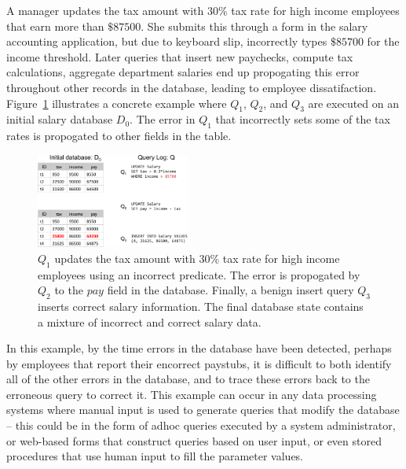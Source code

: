 {\color{blue}
\begin{example}\label{ex:telco}
  A manager updates the tax amount with $30\%$ tax rate for high income employees that earn more than $\$87500$.
  She submits this through a form in the salary accounting application, 
  but due to keyboard slip, incorrectly types $\$85700$ for the income threshold.  
  Later queries that insert new paychecks, compute tax calculations,
  aggregate department salaries end up propogating this error throughout other records in the database, leading to
  employee dissatifaction.  Figure~\ref{fig:example} illustrates a concrete example where $Q_1$, $Q_2$, and $Q_3$ are executed on an 
  initial salary database $D_0$.  The error in $Q_1$ that incorrectly sets some of the tax rates is propogated to other fields in the table.
\end{example}

\begin{figure}[t]
    \centering
        \includegraphics[width=0.45\textwidth]{figures/example2}
    \caption{$Q_1$ updates the tax amount with $30\%$ tax rate 
      for high income employees using an incorrect predicate.  
      The error is propogated by $Q_2$ to the $pay$ field in the database.
      Finally, a benign insert query $Q_3$ inserts correct salary information. 
      The final database state contains a mixture of incorrect and correct salary data.
    }
    \label{fig:example}
\end{figure}


In this example, by the time errors in the database have been detected, 
perhaps by employees that report their encorrect paystubs, it is difficult 
to both identify all of the other errors in the database, and to trace these errors back to the erroneous query to correct it.
This example can occur in any data processing systems where manual input is used to generate queries that modify the database --
this could be in the form of adhoc queries executed by a system administrator, or web-based forms that construct queries based
on user input, or even stored procedures that use human input to fill the parameter values.
}
